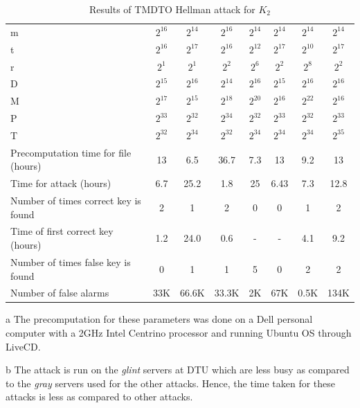 \begin{table}[ht!]
\begin{center}
\caption{Results of TMDTO Hellman attack for $K_2$}
\smallskip
\smallskip
\begin{threeparttable}
\begin{tabular}{|p{3.5cm}||c|c|c|c|c|c|c|}
\hline
m																				&	$2^{16}$ 	&	$2^{14}$ 	&	$2^{16}$ 	&	$2^{14}$ &	$2^{14}$ 	&	$2^{14}$ 	&	$2^{14}$	\\ 
t	  																		&	$2^{16}$ 	&	$2^{17}$ 	&	$2^{16}$ 	&	$2^{12}$ &	$2^{17}$ 	&	$2^{10}$ 	&	$2^{17}$	\\ 
r	  																		&	$2^{1}$ 	&	$2^{1}$ 	&	$2^{2}$ 	&	$2^{6}$	 &	$2^{2}$ 	&	$2^{8}$ 	&	$2^{2}$		\\ 
D	  																		&	$2^{15}$ 	&	$2^{16}$ 	&	$2^{14}$ 	&	$2^{16}$ &	$2^{15}$ 	&	$2^{16}$ 	&	$2^{16}$	\\ \hline \hline
M																				&	$2^{17}$ 	&	$2^{15}$ 	&	$2^{18}$ 	&	$2^{20}$ &	$2^{16}$ 	&	$2^{22}$ 	&	$2^{16}$	\\ 
P	  																		&	$2^{33}$ 	&	$2^{32}$ 	&	$2^{34}$ 	&	$2^{32}$ &	$2^{33}$ 	&	$2^{32}$ 	&	$2^{33}$	\\ 
T	  																		&	$2^{32}$ 	&	$2^{34}$ 	&	$2^{32}$ 	&	$2^{34}$ &	$2^{34}$ 	&	$2^{34}$ 	&	$2^{35}$	\\ \hline \hline
Precomputation time for file (hours)		&	13 	 			&	6.5 			&	36.7 \tnote{a}	&	7.3&	13 	 			&	9.2 \tnote{a} &	13		\\ \hline
Time for attack	(hours)									&	6.7 			&	25.2			&	1.8	 \tnote{b}	&	25 &	6.43 \tnote{b}&	7.3 \tnote{b}	&	12.8 \tnote{b}	\\ \hline
Number of times correct key is found 		&	2 				&	1					&	2 				&	0 			 &	0 	 			&	1   			&	2				\\ \hline
Time of first correct key (hours)				&	1.2 			&	24.0			&	0.6	 		 	&	-		 		 &	- 	 			&	4.1 			&	9.2			\\ \hline
Number of times false key is found			&	0 				&	1 				&	1					&	5				 &	0 	 			&	2 				&	2				\\ \hline
Number of false alarms									&	33K 			&	66.6K			&	33.3K			&	2K			 &	67K 			&	0.5K			&	134K		\\ \hline
\end{tabular}
\smallskip
\begin{tablenotes}
	\item[a] The precomputation for these parameters was done on a Dell personal computer with a 2GHz Intel Centrino processor and running Ubuntu OS through LiveCD.
	\item[b] The attack is run on the \textit{glint} servers at DTU which are less busy as compared to the \textit{gray} servers used for the other attacks. Hence, the time taken for these attacks is less as compared to other attacks.
\end{tablenotes}
\end{threeparttable}
\end{center}
\label{tab:hellman-attack-results}
\end{table}

